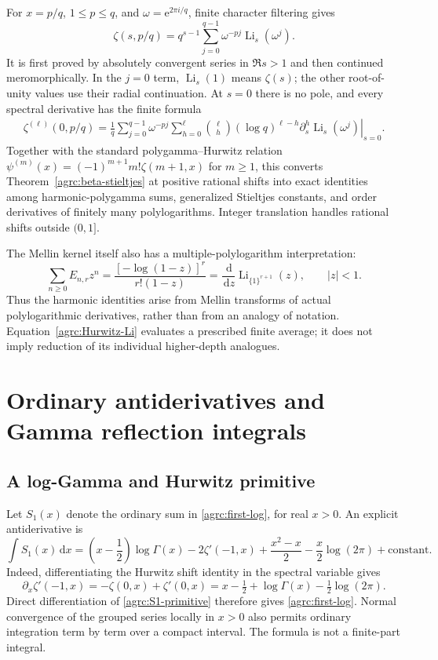 \documentclass[11pt]{article}
\numberwithin{equation}{section}
\theoremstyle{definition}\newtheorem{definition}[theorem]{Definition}
\theoremstyle{remark}\newtheorem{remark}[theorem]{Remark}
\newcommand{\Li}{\operatorname{Li}}
\newcommand{\dd}{\,\mathrm d}
\newcommand{\e}{\mathrm e}
\begin{document}
For $x=p/q$, $1\leq p\leq q$, and $\omega=\e^{2\pi i/q}$,
finite character filtering gives
\begin{equation}\label{agrc:Hurwitz-Li}
 \zeta(s,p/q)=q^{s-1}\sum_{j=0}^{q-1}\omega^{-pj}\Li_s(\omega^j).
\end{equation}
It is first proved by absolutely convergent series in $\Re s>1$ and
then continued meromorphically. In the $j=0$ term, $\Li_s(1)$ means
$\zeta(s)$; the other root-of-unity values use their radial continuation.
At $s=0$ there is no pole, and every spectral derivative has the finite
formula
\begin{align}
 \zeta^{(\ell)}(0,p/q)
  =\frac1q\sum_{j=0}^{q-1}\omega^{-pj}
       \sum_{h=0}^{\ell}\binom{\ell}{h}(\log q)^{\ell-h}
       \left.\partial_s^h\Li_s(\omega^j)\right|_{s=0}.
 \label{agrc:Li-order-jets}
\end{align}
Together with the standard polygamma--Hurwitz relation
$\psi^{(m)}(x)=(-1)^{m+1}m!\zeta(m+1,x)$ for $m\geq1$,
this converts Theorem~\ref{agrc:beta-stieltjes} at positive rational
shifts into exact identities among harmonic-polygamma sums, generalized
Stieltjes constants, and order derivatives of finitely many polylogarithms.
Integer translation handles rational shifts outside $(0,1]$.

The Mellin kernel itself also has a multiple-polylogarithm interpretation:
\begin{equation}\label{agrc:Li-all-ones}
 \sum_{n\geq0}E_{n,r}z^n
  =\frac{[-\log(1-z)]^r}{r!(1-z)}
  =\frac{\dd}{\dd z}\Li_{\{1\}^{r+1}}(z),\qquad |z|<1.
\end{equation}
Thus the harmonic identities arise from Mellin transforms of actual
polylogarithmic derivatives, rather than from an analogy of notation.
Equation~\eqref{agrc:Hurwitz-Li} evaluates a prescribed finite average;
it does not imply reduction of its individual higher-depth analogues.

\section{Ordinary antiderivatives and Gamma reflection integrals}
\label{agrc:primitives}

\subsection{A log-Gamma and Hurwitz primitive}

Let $S_1(x)$ denote the ordinary sum in \eqref{agrc:first-log}, for real
$x>0$. An explicit antiderivative is
\begin{equation}\label{agrc:S1-primitive}
 \boxed{\displaystyle
 \int S_1(x)\dd x=
 \left(x-\frac12\right)\log\Gamma(x)-2\zeta'(-1,x)
 +\frac{x^2-x}{2}-\frac{x}{2}\log(2\pi)+\mathrm{constant}.}
\end{equation}
Indeed, differentiating the Hurwitz shift identity in the spectral
variable gives
\[
 \partial_x\zeta'(-1,x)=-\zeta(0,x)+\zeta'(0,x)
 =x-\tfrac12+\log\Gamma(x)-\tfrac12\log(2\pi).
\]
Direct differentiation of \eqref{agrc:S1-primitive} therefore gives
\eqref{agrc:first-log}. Normal convergence of the grouped series locally
in $x>0$ also permits ordinary integration term by term over a compact
interval. The formula is not a finite-part integral.
\end{document}
